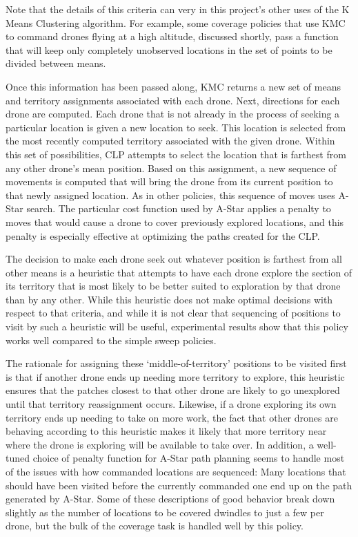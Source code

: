 Note that the details of this criteria can very in this project's other uses of the K Means Clustering algorithm. For example, some coverage policies that use KMC to command drones flying at a high altitude, discussed shortly, pass a function that will keep only completely unobserved locations in the set of points to be divided between means.

Once this information has been passed along, KMC returns a new set of means and territory assignments associated with each drone. Next, directions for each drone are computed. Each drone that is not already in the process of seeking a particular location is given a new location to seek. This location is selected from the most recently computed territory associated with the given drone. Within this set of possibilities, CLP attempts to select the location that is farthest from any other drone's mean position. Based on this assignment, a new sequence of movements is computed that will bring the drone from its current position to that newly assigned location. As in other policies, this sequence of moves uses A-Star search. The particular cost function used by A-Star applies a penalty to moves that would cause a drone to cover previously explored locations, and this penalty is especially effective at optimizing the paths created for the CLP.

The decision to make each drone seek out whatever position is farthest from all other means is a heuristic that attempts to have each drone explore the section of its territory that is most likely to be better suited to exploration by that drone than by any other. While this heuristic does not make optimal decisions with respect to that criteria, and while it is not clear that sequencing of positions to visit by such a heuristic will be useful, experimental results show that this policy works well compared to the simple sweep policies.

The rationale for assigning these `middle-of-territory' positions to be visited first is that if another drone ends up needing more territory to explore, this heuristic ensures that the patches closest to that other drone are likely to go unexplored until that territory reassignment occurs. Likewise, if a drone exploring its own territory ends up needing to take on more work, the fact that other drones are behaving according to this heuristic makes it likely that more territory near where the drone is exploring will be available to take over. In addition, a well-tuned choice of penalty function for A-Star path planning seems to handle most of the issues with how commanded locations are sequenced: Many locations that should have been visited before the currently commanded one end up on the path generated by A-Star. Some of these descriptions of good behavior break down slightly as the number of locations to be covered dwindles to just a few per drone, but the bulk of the coverage task is handled well by this policy.

